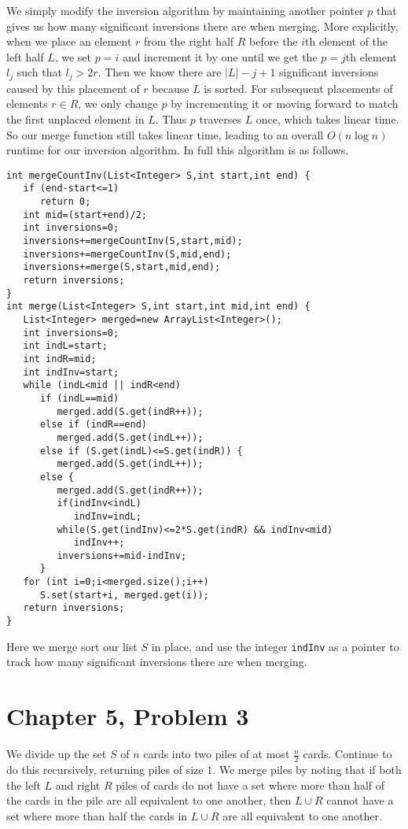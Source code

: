 \documentclass[12pt]{article}
\begin{document}
We simply modify the inversion algorithm by maintaining another pointer \(p\) that gives us how many significant inversions there are when merging.
More explicitly, when we place an element \(r\) from the right half \(R\) before the \(i\)th element of the left half \(L\), we set \(p=i\) and increment it by one until
we get the \(p=j\)th element \(l_j\) such that \(l_j>2r\). Then we know there are \(|L|-j+1\) significant inversions caused by this placement of \(r\) because \(L\)
is sorted. For subsequent placements of elements \(r\in R\), we only change \(p\) by incrementing it or moving forward to match the first unplaced element in \(L\). Thus
\(p\) traverses \(L\) once, which takes linear time. So our merge function still takes linear time, leading to an overall \(O(n \log n)\) runtime for our inversion algorithm.
In full this algorithm is as follows.
\begin{verbatim}
int mergeCountInv(List<Integer> S,int start,int end) {
   if (end-start<=1)
      return 0;
   int mid=(start+end)/2;
   int inversions=0;
   inversions+=mergeCountInv(S,start,mid);
   inversions+=mergeCountInv(S,mid,end);
   inversions+=merge(S,start,mid,end);
   return inversions;
}
int merge(List<Integer> S,int start,int mid,int end) {
   List<Integer> merged=new ArrayList<Integer>();
   int inversions=0;
   int indL=start;
   int indR=mid;
   int indInv=start;
   while (indL<mid || indR<end)
      if (indL==mid)
         merged.add(S.get(indR++));
      else if (indR==end)
         merged.add(S.get(indL++));
      else if (S.get(indL)<=S.get(indR)) {
         merged.add(S.get(indL++));
      else {
         merged.add(S.get(indR++));
         if(indInv<indL)
            indInv=indL;
         while(S.get(indInv)<=2*S.get(indR) && indInv<mid)
            indInv++;
         inversions+=mid-indInv;
      }
   for (int i=0;i<merged.size();i++)
      S.set(start+i, merged.get(i));
   return inversions;
}
\end{verbatim}

Here we merge sort our list \(S\) in place, and use the integer \texttt{indInv} as a pointer to track how many significant inversions there are when merging.

\pagebreak

\section*{Chapter 5, Problem 3}

We divide up the set \(S\) of \(n\) cards into two piles of at most \(\frac{n}{2}\) cards. Continue to do this recursively, returning piles of size \(1\). We merge piles
by noting that if both the left \(L\) and right \(R\) piles of cards do not have a set where more than half of the cards
in the pile are all equivalent to one another, then \(L\cup R\) cannot have a set where more than half the cards in \(L\cup R\) are all
equivalent to one another.
\end{document}

